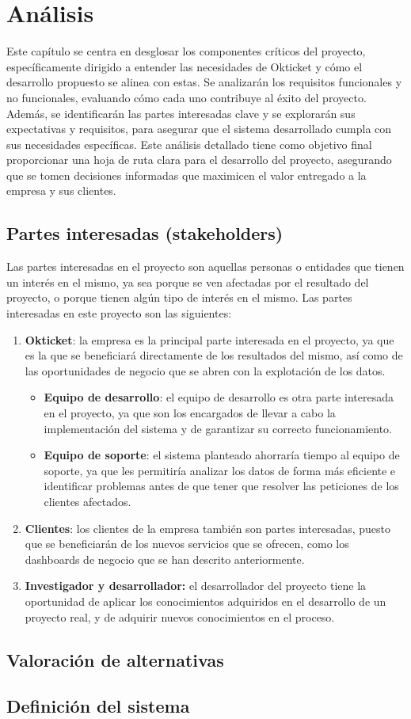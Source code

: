 \chapter{Análisis}\label{chap:analisis}
Este capítulo se centra en desglosar los componentes críticos del proyecto, específicamente
dirigido a entender las necesidades de Okticket y cómo el desarrollo propuesto se alinea con estas.
Se analizarán los requisitos funcionales y no funcionales, evaluando cómo cada uno contribuye al
éxito del proyecto. Además, se identificarán las partes interesadas clave y se explorarán sus
expectativas y requisitos, para asegurar que el sistema desarrollado cumpla con sus necesidades
específicas. Este análisis detallado tiene como objetivo final proporcionar una hoja de ruta
clara para el desarrollo del proyecto, asegurando que se tomen decisiones informadas que maximicen
el valor entregado a la empresa y sus clientes.

\section{Partes interesadas (stakeholders)}\label{sec:stakeholders}
Las partes interesadas en el proyecto son aquellas personas o entidades que tienen un interés
en el mismo, ya sea porque se ven afectadas por el resultado del proyecto, o porque tienen
algún tipo de interés en el mismo. Las partes interesadas en este proyecto son las siguientes:

\begin{enumerate}
	\item \textbf{Okticket}: la empresa es la principal parte interesada en el proyecto, ya que
		es la que se beneficiará directamente de los resultados del mismo, así como de las
		oportunidades de negocio que se abren con la explotación de los datos.
		\begin{itemize}
			\item \textbf{Equipo de desarrollo}: el equipo de desarrollo es otra parte interesada en el
				proyecto, ya que son los encargados de llevar a cabo la implementación del sistema y
				de garantizar su correcto funcionamiento.
			\item \textbf{Equipo de soporte}: el sistema planteado ahorraría tiempo al equipo de
				soporte, ya que les permitiría analizar los datos de forma más eficiente e identificar
				problemas antes de que tener que resolver las peticiones de los clientes afectados.
		\end{itemize}
	\item \textbf{Clientes}: los clientes de la empresa también son partes interesadas, puesto
		que se beneficiarán de los nuevos servicios que se ofrecen, como los dashboards de
		negocio que se han descrito anteriormente.
	\item \textbf{Investigador y desarrollador:} el desarrollador del proyecto tiene la oportunidad de
		aplicar los conocimientos adquiridos en el desarrollo de un proyecto real, y de adquirir
		nuevos conocimientos en el proceso.
\end{enumerate}

\section{Valoración de alternativas}\label{sec:alternativas}


\section{Definición del sistema}\label{sec:definicion}
